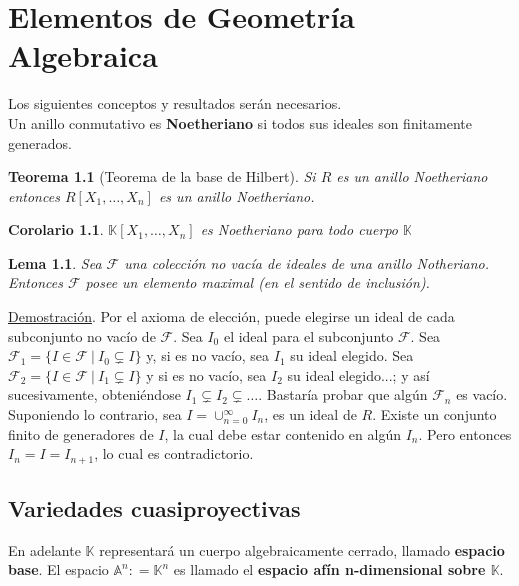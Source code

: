 \documentclass[12pt,a4paper]{report}
\newcommand{\ea}{\mathbb{A}^{n}}
\newcommand{\K}{\mathbb{K}}
\newcommand{\F}{\mathscr{F}}
\newtheorem{teo}{Teorema}[chapter]
\newtheorem{cor}{Corolario}[chapter]
\newtheorem{lem}{Lema}[chapter]
\begin{document}
\newpage{}


\chapter{Elementos de Geometría Algebraica}

Los siguientes conceptos y resultados serán necesarios.\\

Un anillo conmutativo es \textbf{Noetheriano} si todos sus ideales son finitamente generados.

\begin{teo}[Teorema de la base de Hilbert]
	Si $R$ es un anillo Noetheriano entonces $R[X_{1}, \ldots , X_{n}]$ es un anillo Noetheriano.
\end{teo}

\begin{cor}
	$\K[X_{1}, \ldots, X_{n}]$ es Noetheriano para todo cuerpo $\K$
\end{cor}

\begin{lem}\label{lema}
	Sea $\F$ una colección no vacía de ideales de una anillo Notheriano. Entonces $\F$ posee un elemento maximal (en el sentido de inclusión).
\end{lem}
\underline{Demostración}. Por el axioma de elección, puede elegirse un ideal de cada subconjunto no vacío de $\F$. Sea $I_{0}$ el ideal para el subconjunto $\F$. Sea $\F_{1}= \{ I \in \F \: | \: I_{0} \subsetneq I \} $ y, si es no vacío, sea $I_{1}$ su ideal elegido. Sea $\F_{2}= \{ I \in \F \: | \: I_{1} \subsetneq I \} $ y si es no vacío, sea $I_{2}$ su ideal elegido...;  y así sucesivamente, obteniéndose $I_{1} \subsetneq I_{2} \subsetneq \ldots $. Bastaría probar que algún $\F_{n}$ es vacío. Suponiendo lo contrario, sea $I= \cup_{n=0}^{\infty}I_{n}$, es un ideal de $R$. Existe un conjunto finito de generadores de $I$, la cual debe estar contenido en algún $I_{n}$. Pero entonces $I_{n} =I = I_{n+1}$, lo cual es contradictorio.

\section{Variedades cuasiproyectivas}

En adelante $\K$ representará un cuerpo algebraicamente cerrado, llamado \textbf{espacio base}. El espacio $\ea : = \K ^{n}$ es llamado el \textbf{espacio afín n-dimensional sobre $\K$}.\\
\end{document}
